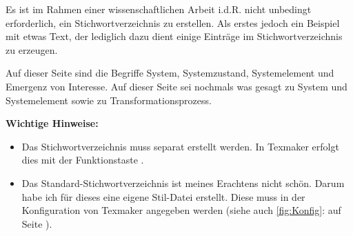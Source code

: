 
Es ist im Rahmen einer wissenschaftlichen Arbeit i.d.R. nicht unbedingt erforderlich, ein Stichwortverzeichnis zu erstellen. Als erstes jedoch ein Beispiel mit etwas Text, der lediglich dazu dient einige Einträge im Stichwortverzeichnis zu erzeugen.

Auf dieser Seite sind die Begriffe System, Systemzustand, Systemelement und Emergenz von Interesse. Auf dieser Seite sei nochmals was gesagt zu System und Systemelement sowie zu Transformationsprozess.

\textbf{Wichtige Hinweise:}  
\begin{itemize}[rightmargin=1.0cm]
\item{Das Stichwortverzeichnis muss separat erstellt werden. In Texmaker erfolgt dies mit der Funktionstaste .} 
\item{Das Standard-Stichwortverzeichnis ist meines Erachtens nicht schön. Darum habe ich für dieses eine eigene Stil-Datei  erstellt. Diese muss in der Konfiguration von Texmaker angegeben werden (siehe auch \cref{fig:Konfig}:  auf Seite \pageref{fig:Konfig}).}
\end{itemize}
